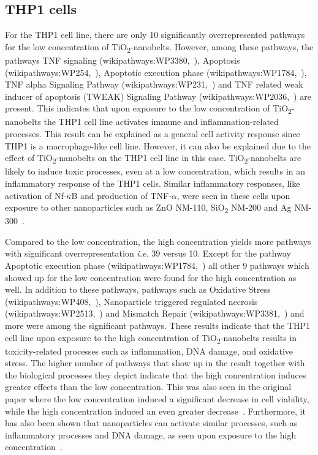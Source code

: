 \documentclass[ijms,article,submit,moreauthors,pdftex]{Definitions/mdpi}
\begin{document}
\subsection*{THP1 cells}
For the THP1 cell line, there are only 10 significantly overrepresented pathways for the low concentration of TiO\textsubscript{2}-nanobelts. However, among these pathways, the pathways TNF signaling (wikipathways:WP3380,~\cite{WP3380}), Apoptosis (wikipathways:WP254,~\cite{WP254}), Apoptotic execution phase (wikipathways:WP1784,~\cite{WP1784}), TNF alpha Signaling Pathway (wikipathways:WP231,~\cite{WP231}) and TNF related weak inducer of apoptosis (TWEAK) Signaling Pathway (wikipathways:WP2036,~\cite{WP2036}) are present. This indicates that upon exposure to the low concentration of TiO\textsubscript{2}-nanobelts the THP1 cell line activates immune and inflammation-related processes. This result can be explained as a general cell activity response since THP1 is a macrophage-like cell line. However, it can also be explained due to the effect of TiO\textsubscript{2}-nanobelts on the THP1 cell line in this case. TiO\textsubscript{2}-nanobelts are likely to induce toxic processes, even at a low concentration, which results in an inflammatory response of the THP1 cells. Similar inflammatory responses, like activation of Nf-$\kappa$B and production of TNF-$\alpha$, were seen in these cells upon exposure to other nanoparticles such as ZnO NM-110, SiO\textsubscript{2} NM-200 and Ag NM-300~\cite{Brzicova2019}. 

Compared to the low concentration, the high concentration yields more pathways with significant overrepresentation \textit{i.e.} 39 versus 10. Except for the pathway Apoptotic execution phase (wikipathways:WP1784,~\cite{WP1784}) all other 9 pathways which showed up for the low concentration were found for the high concentration as well. In addition to these pathways, pathways such as Oxidative Stress (wikipathways:WP408,~\cite{WP408}), Nanoparticle triggered regulated necrosis (wikipathways:WP2513,~\cite{WP2513}) and Mismatch Repair (wikipathways:WP3381,~\cite{WP3381}) and more were among the significant pathways. These results indicate that the THP1 cell line upon exposure to the high concentration of TiO\textsubscript{2}-nanobelts results in toxicity-related processes such as inflammation, DNA damage, and oxidative stress. The higher number of pathways that show up in the result together with the biological processes they depict indicate that the high concentration induces greater effects than the low concentration. This was also seen in the original paper where the low concentration induced a significant decrease in cell viability, while the high concentration induced an even greater decrease~\cite{Tilton2013}. Furthermore, it has also been shown that nanoparticles can activate similar processes, such as inflammatory processes and DNA damage, as seen upon exposure to the high concentration~\cite{Brzicova2019,Huang2017}.
\end{document}
